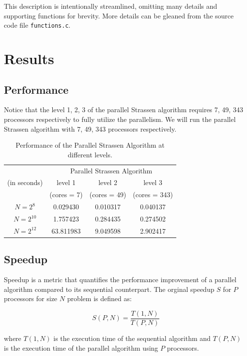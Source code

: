 \documentclass[12pt,a4paper]{article}
\begin{document}
This description is intentionally streamlined, 
omitting many details and supporting functions for brevity. 
More details can be gleaned from the source code file \texttt{functions.c}.

\section{Results}
\subsection{Performance}
Notice that the level 1, 2, 3 of the parallel Strassen algorithm requires 7, 49, 343 processors respectively to 
fully utilize the parallelism. We will run the parallel Strassen algorithm with 7, 49, 343 processors respectively.
\begin{table}[ht]
    \centering
    \begin{tabular}{cccc}
        \toprule
        & \multicolumn{3}{c}{Parallel Strassen Algorithm} \\
        \cmidrule(lr){2-4}
        (in seconds) &  level 1  &  level 2  &  level 3 \\
        & (cores = 7) & (cores = 49) & (cores = 343) \\
        \midrule
        \( N = 2^8 \)  & 0.029430 & 0.010317 & 0.040137 \\
        \( N = 2^{10} \) & 1.757423 & 0.284435 & 0.274502 \\
        \( N = 2^{12} \) & 63.811983 & 9.049598 & 2.902417 \\
        \bottomrule
    \end{tabular}
    \caption{Performance of the Parallel Strassen Algorithm at different levels.}
    \label{tab:results}
\end{table}


\subsection{Speedup}
Speedup is a metric that quantifies the performance improvement of a parallel algorithm compared to its sequential counterpart. 
The orginal speedup \( S \) for \( P \) processors for size $N$ problem is defined as:

\begin{equation*}
    S(P, N) = \frac{T(1,N)}{T(P, N)}
\end{equation*}

where \( T(1,N) \) is the execution time of the sequential algorithm and 
 \( T(P, N) \) is the execution time of the parallel algorithm using \( P \) processors.
\end{document}
